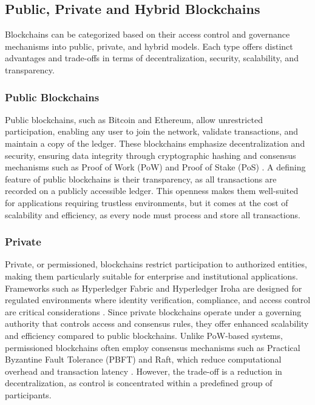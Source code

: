 \documentclass[final]{rc-book-2.14}
\begin{document}
\subsection{Public, Private and Hybrid Blockchains}

Blockchains can be categorized based on their access control and governance mechanisms into public, private, and hybrid models. Each type offers distinct advantages and trade-offs in terms of decentralization, security, scalability, and transparency.

\subsubsection{Public Blockchains}

Public blockchains, such as Bitcoin and Ethereum, allow unrestricted participation, enabling any user to join the network, validate transactions, and maintain a copy of the ledger. These blockchains emphasize decentralization and security, ensuring data integrity through cryptographic hashing and consensus mechanisms such as Proof of Work (PoW) and Proof of Stake (PoS) \cite{nakamoto2008bitcoin}. A defining feature of public blockchains is their transparency, as all transactions are recorded on a publicly accessible ledger. This openness makes them well-suited for applications requiring trustless environments, but it comes at the cost of scalability and efficiency, as every node must process and store all transactions.

\subsubsection{Private}

Private, or permissioned, blockchains restrict participation to authorized entities, making them particularly suitable for enterprise and institutional applications. Frameworks such as Hyperledger Fabric and Hyperledger Iroha are designed for regulated environments where identity verification, compliance, and access control are critical considerations \cite{cachin2016architecture}. Since private blockchains operate under a governing authority that controls access and consensus rules, they offer enhanced scalability and efficiency compared to public blockchains. Unlike PoW-based systems, permissioned blockchains often employ consensus mechanisms such as Practical Byzantine Fault Tolerance (PBFT) and Raft, which reduce computational overhead and transaction latency \cite{vukolic2017}. However, the trade-off is a reduction in decentralization, as control is concentrated within a predefined group of participants.
\end{document}

